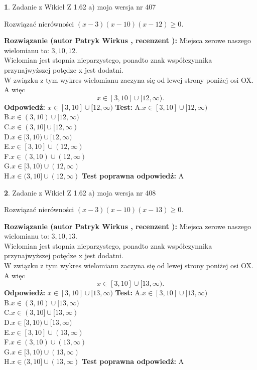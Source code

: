\documentclass[12pt, a4paper]{article}
\theoremstyle{definition} %
\newtheorem{zad}{}
\newcommand{\zadStart}[1]{\begin{zad}#1\newline}
\newcommand{\zadStop}{\end{zad}}
\newcommand{\rozwStart}[2]{\noindent \textbf{Rozwiązanie (autor #1 , recenzent #2): }\newline}
\newcommand{\rozwStop}{\newline}
\newcommand{\odpStart}{\noindent \textbf{Odpowiedź:}\newline}
\newcommand{\odpStop}{\newline}
\newcommand{\testStart}{\noindent \textbf{Test:}\newline}
\newcommand{\testStop}{\newline}
\newcommand{\kluczStart}{\noindent \textbf{Test poprawna odpowiedź:}\newline}
\newcommand{\kluczStop}{\newline}
\begin{document}
\zadStart{Zadanie z Wikieł Z 1.62 a) moja wersja nr 407}

Rozwiązać nierówności $(x-3)(x-10)(x-12)\ge0$.
\zadStop
\rozwStart{Patryk Wirkus}{}
Miejsca zerowe naszego wielomianu to: $3, 10, 12$.\\
Wielomian jest stopnia nieparzystego, ponadto znak współczynnika przy\linebreak najwyższej potędze x jest dodatni.\\ W związku z tym wykres wielomianu zaczyna się od lewej strony poniżej osi OX. A więc $$x \in [3,10] \cup [12,\infty).$$
\rozwStop
\odpStart
$x \in [3,10] \cup [12,\infty)$
\odpStop
\testStart
A.$x \in [3,10] \cup [12,\infty)$\\
B.$x \in (3,10) \cup [12,\infty)$\\
C.$x \in (3,10] \cup [12,\infty)$\\
D.$x \in [3,10) \cup [12,\infty)$\\
E.$x \in [3,10] \cup (12,\infty)$\\
F.$x \in (3,10) \cup (12,\infty)$\\
G.$x \in [3,10) \cup (12,\infty)$\\
H.$x \in (3,10] \cup (12,\infty)$
\testStop
\kluczStart
A
\kluczStop



\zadStart{Zadanie z Wikieł Z 1.62 a) moja wersja nr 408}

Rozwiązać nierówności $(x-3)(x-10)(x-13)\ge0$.
\zadStop
\rozwStart{Patryk Wirkus}{}
Miejsca zerowe naszego wielomianu to: $3, 10, 13$.\\
Wielomian jest stopnia nieparzystego, ponadto znak współczynnika przy\linebreak najwyższej potędze x jest dodatni.\\ W związku z tym wykres wielomianu zaczyna się od lewej strony poniżej osi OX. A więc $$x \in [3,10] \cup [13,\infty).$$
\rozwStop
\odpStart
$x \in [3,10] \cup [13,\infty)$
\odpStop
\testStart
A.$x \in [3,10] \cup [13,\infty)$\\
B.$x \in (3,10) \cup [13,\infty)$\\
C.$x \in (3,10] \cup [13,\infty)$\\
D.$x \in [3,10) \cup [13,\infty)$\\
E.$x \in [3,10] \cup (13,\infty)$\\
F.$x \in (3,10) \cup (13,\infty)$\\
G.$x \in [3,10) \cup (13,\infty)$\\
H.$x \in (3,10] \cup (13,\infty)$
\testStop
\kluczStart
A
\kluczStop
\end{document}
